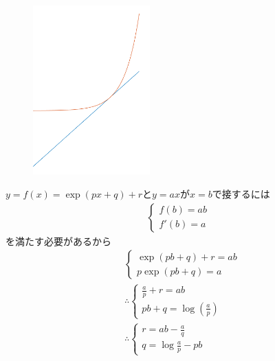 \documentclass[a4paper,11pt]{jsarticle}
\begin{document}
\title{}
\author{}
\date{\today}
\maketitle

\begin{figure}[b]
  \centering
  \includegraphics[width = 0.4\textwidth]{210425_spinNumの評価_01.png}
  \caption{}
  \label{}
\end{figure}

$y=f(x)=\exp(px + q) + r$と$y = ax$が$x=b$で接するには
\begin{align*}
  \begin{cases}
    f(b) = ab \\
    f'(b) = a
  \end{cases}
\end{align*}
を満たす必要があるから
\begin{align*}
  &\begin{cases}
    \exp(pb + q) + r = ab\\
    p\exp(pb + q)=a
  \end{cases}
  \\
  &\therefore\begin{cases}
    \frac{a}{p} + r = ab\\
    pb + q = \log(\frac{a}{p})
  \end{cases}
  \\
  &\therefore\begin{cases}
    r = ab - \frac{a}{q}\\
    q = \log\frac{a}{p} - pb
  \end{cases}
\end{align*}
\end{document}
